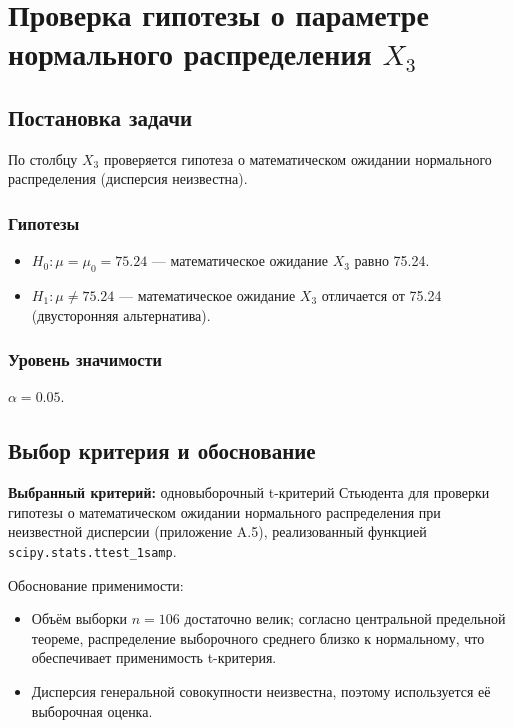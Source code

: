 \section{Проверка гипотезы о параметре нормального распределения \(X_3\)}

\subsection{Постановка задачи}

По столбцу \(X_3\) проверяется гипотеза о математическом ожидании нормального распределения (дисперсия неизвестна).

\subsubsection{Гипотезы}
\begin{itemize}
    \item \(H_0: \mu = \mu_0 = 75.24\) — математическое ожидание \(X_3\) равно 75.24.
    \item \(H_1: \mu \neq 75.24\) — математическое ожидание \(X_3\) отличается от 75.24 (двусторонняя альтернатива).
\end{itemize}

\subsubsection{Уровень значимости}
\(\alpha = 0.05\).

\subsection{Выбор критерия и обоснование}

\textbf{Выбранный критерий:} одновыборочный t-критерий Стьюдента для проверки гипотезы о математическом ожидании нормального распределения при неизвестной дисперсии (приложение A.5), реализованный функцией \texttt{scipy.stats.ttest\_1samp}.

Обоснование применимости:
\begin{itemize}
    \item Объём выборки \(n = 106\) достаточно велик; согласно центральной предельной теореме, распределение выборочного среднего близко к нормальному, что обеспечивает применимость t-критерия.
    \item Дисперсия генеральной совокупности неизвестна, поэтому используется её выборочная оценка.
\end{itemize}

